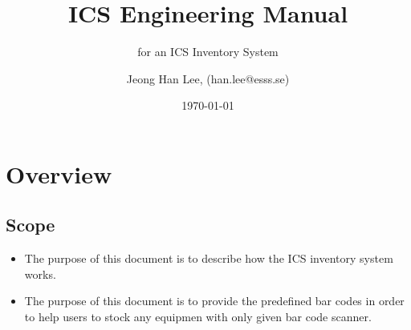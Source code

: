 \documentclass[11pt
  , a4paper
  , article
  , oneside
  , showtrims
]{memoir}
\begin{document}


\date{\today}




\title{ICS Engineering Manual}
\subtitle{for an ICS Inventory System}
\author{Jeong Han Lee, (han.lee@esss.se)}



\showtrimson

\esstitle
\newpage
\tableofcontents
\newpage



\chapter{Overview}

\section{Scope}
\begin{itemize}
\item The purpose of this document is to describe how the ICS inventory system works.
\item The purpose of this document is to provide the predefined bar codes in order to help users to stock any equipmen with only given bar code scanner.
\end{itemize}
\end{document}
